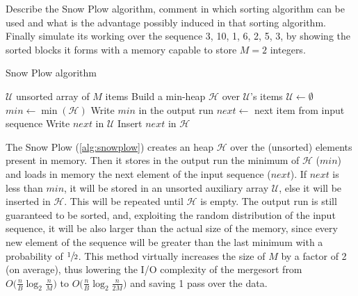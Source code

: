 \exercise

Describe the Snow Plow algorithm, comment in which sorting algorithm can be used
and what is the advantage possibly induced in that sorting algorithm. Finally
simulate its working over the sequence 3, 10, 1, 6, 2, 5, 3, by showing the
sorted blocks it forms with a memory capable to store $M = 2$ integers.

\solution

\begin{algorithm}[b]
\caption{Snow Plow algorithm}\label{alg:snowplow}
\begin{algorithmic}[1]
\Require $\mathcal{U}$ unsorted array of $M$ items
\State Build a min-heap $\mathcal{H}$ over $\mathcal{U}$'s items
\State $\mathcal{U} \gets \emptyset$
  \State $min \gets \min(\mathcal{H})$
  \State Write $min$ in the output run
  \State $next \gets$ next item from input sequence
    \State Write $next$ in $\mathcal{U}$
  \Else
    \State Insert $next$ in $\mathcal{H}$
  \EndIf
\EndWhile
\end{algorithmic}
\end{algorithm}
%
The Snow Plow (\autoref{alg:snowplow}) creates an heap $\mathcal{H}$ over the
(unsorted) elements present in memory. Then it stores in the output run the
minimum of $\mathcal{H}$ ($min$) and loads in memory the next element of the
input sequence ($next$). If $next$ is less than $min$, it will be stored in an
unsorted auxiliary array $\mathcal{U}$, else it will be inserted in
$\mathcal{H}$. This will be repeated until $\mathcal{H}$ is empty. The output
run is still guaranteed to be sorted, and, exploiting the random distribution of
the input sequence, it will be also larger than the actual size of the memory,
since every new element of the sequence will be greater than the last minimum
with a probability of $\sfrac{1}{2}$. This method virtually increases the size
of $M$ by a factor of 2 (on average), thus lowering the I/O complexity of the
mergesort from $O\big(\frac{n}{B}\log_2\frac{n}{M}\big)$ to
$O\big(\frac{n}{B}\log_2\frac{n}{2M}\big)$ and saving 1 pass over the data.

